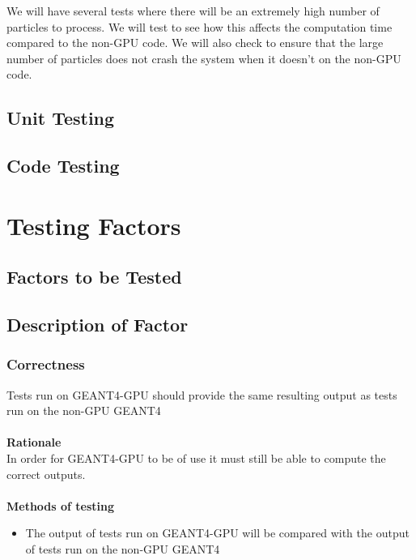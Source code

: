 \documentclass[12pt]{article}
\begin{document}
We will have several tests where there will be an extremely high number of particles to process. We will test to see how this affects the computation time compared to the non-GPU code. We will also check to ensure that the large number of particles does not crash the system when it doesn't on the non-GPU code.

\subsection{Unit Testing} %

\subsection{Code Testing} %

\section{Testing Factors}

\subsection{Factors to be Tested} %

\subsection{Description of Factor} %
\subsubsection{Correctness}
Tests run on GEANT4-GPU should provide the same resulting output as tests run on the non-GPU GEANT4\\\\
\textbf{Rationale}\\
In order for GEANT4-GPU to be of use it must still be able to compute the correct outputs. \\\\
\textbf{Methods of testing}
\begin{itemize}
\item The output of tests run on GEANT4-GPU will be compared with the output of tests run on the non-GPU GEANT4
\end{itemize}
\end{document}
